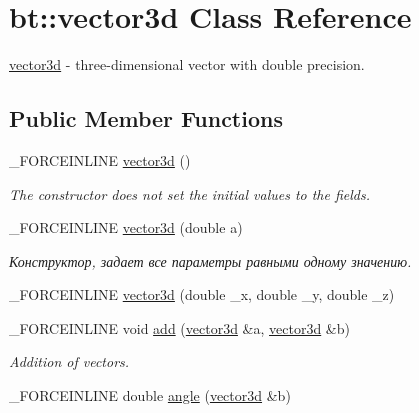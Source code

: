 \hypertarget{classbt_1_1vector3d}{\section{bt\-:\-:vector3d Class Reference}
\label{classbt_1_1vector3d}
}


\hyperlink{classbt_1_1vector3d}{vector3d} -\/ three-\/dimensional vector with double precision.  


\subsection*{Public Member Functions}
\begin{DoxyCompactItemize}
\item 
\hypertarget{classbt_1_1vector3d_ad2d127d46f22392ec92f8be7e3d84cb9}{\-\_\-\-F\-O\-R\-C\-E\-I\-N\-L\-I\-N\-E \hyperlink{classbt_1_1vector3d_ad2d127d46f22392ec92f8be7e3d84cb9}{vector3d} ()}\label{classbt_1_1vector3d_ad2d127d46f22392ec92f8be7e3d84cb9}

\begin{DoxyCompactList}\small\item\em The constructor does not set the initial values to the fields. \end{DoxyCompactList}\item 
\hypertarget{classbt_1_1vector3d_aa260b531376f1ffac41797c0eb2adcbe}{\-\_\-\-F\-O\-R\-C\-E\-I\-N\-L\-I\-N\-E \hyperlink{classbt_1_1vector3d_aa260b531376f1ffac41797c0eb2adcbe}{vector3d} (double a)}\label{classbt_1_1vector3d_aa260b531376f1ffac41797c0eb2adcbe}

\begin{DoxyCompactList}\small\item\em Конструктор, задает все параметры равными одному значению. \end{DoxyCompactList}\item 
\-\_\-\-F\-O\-R\-C\-E\-I\-N\-L\-I\-N\-E \hyperlink{classbt_1_1vector3d_a2fb57165ba9043f0ede91a3e1da74662}{vector3d} (double \-\_\-x, double \-\_\-y, double \-\_\-z)
\item 
\hypertarget{classbt_1_1vector3d_ac6ceb6e6c46a61ab105560a9ef706de0}{\-\_\-\-F\-O\-R\-C\-E\-I\-N\-L\-I\-N\-E void \hyperlink{classbt_1_1vector3d_ac6ceb6e6c46a61ab105560a9ef706de0}{add} (\hyperlink{classbt_1_1vector3d}{vector3d} \&a, \hyperlink{classbt_1_1vector3d}{vector3d} \&b)}\label{classbt_1_1vector3d_ac6ceb6e6c46a61ab105560a9ef706de0}

\begin{DoxyCompactList}\small\item\em Addition of vectors. \end{DoxyCompactList}\item 
\hypertarget{classbt_1_1vector3d_a39ef558ef3ad0e2b34faa037eb813f05}{\-\_\-\-F\-O\-R\-C\-E\-I\-N\-L\-I\-N\-E double \hyperlink{classbt_1_1vector3d_a39ef558ef3ad0e2b34faa037eb813f05}{angle} (\hyperlink{classbt_1_1vector3d}{vector3d} \&b)}\label{classbt_1_1vector3d_a39ef558ef3ad0e2b34faa037eb813f05}


\end{DoxyCompactItemize}
